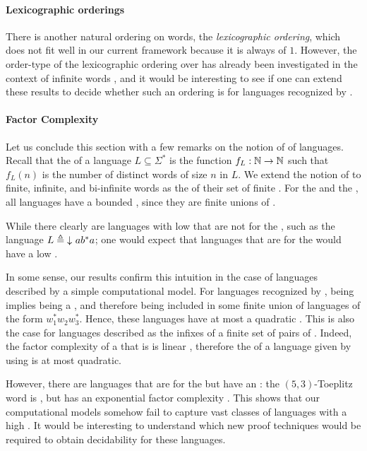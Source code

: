 \paragraph*{Lexicographic orderings} There is another natural ordering on
words, the \emph{lexicographic ordering}, which does not fit well in our
current framework because it is always of  $1$. However, the
order-type of the lexicographic ordering over  has
already been investigated in the context of infinite words \cite{CACOPU18}, and
it would be interesting to see if one can extend these results to decide
whether such an ordering is  for languages recognized by
.

\paragraph*{Factor Complexity} \AP Let us conclude this section with a few
remarks on the notion of  of languages. Recall that the
 of a language $L \subseteq \Sigma^*$ is the function
$f_L: \mathbb{N} \to \mathbb{N}$ such that $f_L(n)$ is the number of distinct words of size
$n$ in $L$. We extend the notion of  to finite, infinite,
and bi-infinite words as the  of their set of finite
. For the  and the , all
 languages have a bounded , since
they are finite unions of .

While there clearly are languages with low  that are not
 for the , such as the language $L
\defined \dwset{ a b^* a }$; one would expect that languages that are
 for the  would have a low .

In some sense, our results confirm this intuition in the case of languages
described by a simple computational model. For languages recognized by
, being  implies being a
, and therefore being  included in some finite union of
languages of the form $w_1^* w_2 w_3^*$. Hence, these languages have at most a
quadratic . This is also the case for languages described
as the infixes of a finite set of pairs of . Indeed, the
factor complexity of a  that is 
is linear \cite[Theorem 24]{NIPR09}, therefore the  of a
language given by  using  is
at most quadratic.

However, there are  languages that are
 for the  but have an : the $(5, 3)$-Toeplitz word is 
\cite[p. 499]{CAKA97}, but has an exponential factor complexity \cite[Theorem
5]{CAKA97}. This shows that our computational models somehow fail to capture
vast classes of  languages with a high . It would be interesting to understand which new proof techniques
would be required to obtain decidability for these languages.
